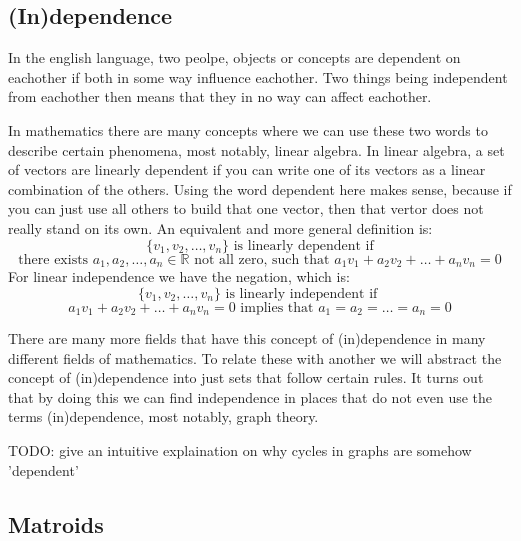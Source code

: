 \subsection{(In)dependence}

In the english language, two peolpe, objects or concepts are dependent on eachother if both in some way influence eachother. Two things being independent from eachother then means that they in no way can affect eachother. 

In mathematics there are many concepts where we can use these two words to describe certain phenomena, most notably, linear algebra. In linear algebra, a set of vectors are linearly dependent if you can write one of its vectors as a linear combination of the others. Using the word dependent here makes sense, because if you can just use all others to build that one vector, then that vertor does not really stand on its own. An equivalent and more general definition is:
$$ \{v_1,v_2,\dots,v_n\} \text{ is linearly dependent if} $$ $$ \text{there exists } a_1,a_2,\dots,a_n \in \mathbb{R} \text{ not all zero, such that } a_1v_1+a_2v_2+\dots +a_nv_n = 0$$
For linear independence we have the negation, which is:
$$ \{v_1,v_2,\dots,v_n\} \text{ is linearly independent if } $$ $$ a_1v_1+a_2v_2+\dots+a_nv_n=0 \text{ implies that } a_1=a_2=\dots=a_n=0 $$

There are many more fields that have this concept of (in)dependence in many different fields of mathematics. To relate these with another we will abstract the concept of (in)dependence into just sets that follow certain rules. It turns out that by doing this we can find independence in places that do not even use the terms (in)dependence, most notably, graph theory.

TODO: give an intuitive explaination on why cycles in graphs are somehow 'dependent'





\newpage

\subsection{Matroids}

